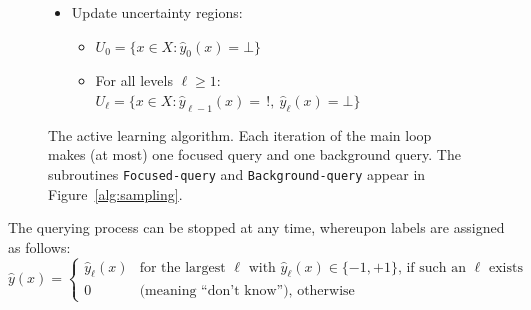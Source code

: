 \documentclass{article}
\def\yh{{\widehat{y}}}
\def\PL{{\mbox{\rm PL}}}
\begin{document}
\begin{figure}[h!]
{\begin{minipage}[t]{6.4in}
\begin{itemize}
\begin{itemize}
\begin{itemize}
\begin{itemize}
\begin{equation}
\begin{array}{cl}
+1 & \mbox{if $\PL_\ell(x) = \{+1\}$} \\
-1 &  \mbox{if $\PL_\ell(x) = \{-1\}$} \\
0 & \mbox{if $\PL_\ell(x) = \{\}$} \\
! & \mbox{if $\PL_\ell(x) = \{-1,+1\}$}
\end{array}
\right.
\label{eq:provisional-label}
\end{equation}
\end{itemize}
\end{itemize}
\item Update uncertainty regions:
\begin{itemize}
\item $U_0 = \{x \in X: \yh_0(x) = \bot\}$
\item For all levels $\ell \geq 1$: $U_\ell = \{x \in X: \yh_{\ell-1}(x) = \,!, \ \yh_\ell(x) = \bot\}$
\end{itemize}
\end{itemize}

\end{itemize}

\end{minipage}}
\caption{The active learning algorithm. Each iteration of the main loop makes (at most) one focused query and one background query. The subroutines {\tt Focused-query} and {\tt Background-query} appear in Figure~\ref{alg:sampling}.}
\label{alg:main}
\end{figure}

The querying process can be stopped at any time, whereupon labels are assigned as follows:
\begin{equation}
\yh(x) = 
\left\{
\begin{array}{ll}
\yh_\ell(x) & \mbox{for the largest $\ell$ with $\yh_\ell(x) \in \{-1,+1\}$, if such an $\ell$ exists} \\
0 & \mbox{(meaning ``don't know''), otherwise}
\end{array}
\right.
\label{eq:final-label}
\end{equation}
\end{document}
